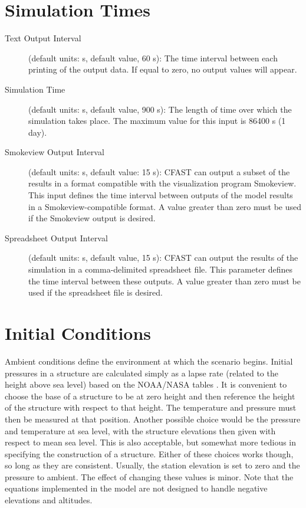 \section{Simulation Times}
\label{info:TIME}

\begin{description}
\item[Text Output Interval] (default units: s, default value, 60 s): The time interval between each printing of the output data.  If equal to zero, no output values will appear.

\item[Simulation Time] (default units: s, default value, 900 s): The length of time over which the simulation takes place. The maximum value for this input is 86400 s (1 day).

\item[Smokeview Output Interval] (default units: s, default value: 15 s): CFAST can output a subset of the results in a format compatible with the visualization program Smokeview. This input defines the time interval between outputs of the model results in a Smokeview-compatible format.  A value greater than zero must be used if the Smokeview output is desired.

\item[Spreadsheet Output Interval] (default units: s, default value, 15 s): CFAST can output the results of the simulation in a comma-delimited spreadsheet file. This parameter defines the time interval between these outputs. A value greater than zero must be used if the spreadsheet file is desired.
\end{description}




\section{Initial Conditions}
\label{info:INIT}

Ambient conditions define the environment at which the scenario begins. Initial pressures in a structure are calculated simply as a lapse rate (related to the height above sea level) based on the NOAA/NASA tables \cite{GPO:Atmosphere}. It is convenient to choose the base of a structure to be at zero height and then reference the height of the structure with respect to that height.  The temperature and pressure must then be measured at that position.  Another possible choice would be the pressure and temperature at sea level, with the structure elevations then given with respect to mean sea level.  This is also acceptable, but somewhat more tedious in specifying the construction of a structure.  Either of these choices works though, so long as they are consistent. Usually, the station elevation is set to zero and the pressure to ambient. The effect of changing these values is minor. Note that the equations implemented in the model are not designed to handle negative elevations and altitudes.

